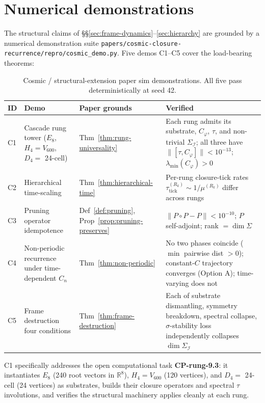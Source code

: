 \documentclass[11pt]{article}
\theoremstyle{plain}
\theoremstyle{definition}
\theoremstyle{remark}
\newcommand{\Ical}{\mathcal{I}}
\newcommand{\Cph}{C_\varphi}
\begin{document}
\section{Numerical demonstrations}\label{sec:cosmic-numerical}

The structural claims of \S\S\ref{sec:frame-dynamics}--\ref{sec:hierarchy} are grounded by a numerical demonstration suite \texttt{papers/cosmic-closure-recurrence/repro/cosmic\_demo.py}. Five demos C1--C5 cover the load-bearing theorems:

\begin{table}[h]
\centering
\small
\caption{Cosmic / structural-extension paper sim demonstrations. All five pass deterministically at seed 42.}\label{tab:cosmic-numerical-demos}
\begin{tabular}{p{0.8cm}p{4.4cm}p{3.0cm}p{5.0cm}}
\toprule
ID & Demo & Paper grounds & Verified \\
\midrule
C1 & Cascade rung tower ($E_8$, $H_4 = V_{600}$, $D_4 =$ 24-cell) & Thm~\ref{thm:rung-universality} & Each rung admits its substrate, $\Cph$, $\tau$, and non-trivial $\Sigma_\Ical$; all three have $\|[\tau, \Cph]\| < 10^{-13}$; $\lambda_{\min}(\Cph) > 0$ \\
C2 & Hierarchical time-scaling & Thm~\ref{thm:hierarchical-time} & Per-rung closure-tick rates $\tau_{\mathrm{tick}}^{(R_k)} \sim 1/\mu^{(R_k)}$ differ across rungs \\
C3 & Pruning operator idempotence & Def~\ref{def:pruning}, Prop~\ref{prop:pruning-preserves} & $\|P \circ P - P\| < 10^{-10}$; $P$ self-adjoint; rank $= \dim \Sigma$ \\
C4 & Non-periodic recurrence under time-dependent $C_n$ & Thm~\ref{thm:non-periodic} & No two phases coincide ($\min$ pairwise dist $> 0$); constant-$C$ trajectory converges (Option A); time-varying does not \\
C5 & Frame destruction four conditions & Thm~\ref{thm:frame-destruction} & Each of substrate dismantling, symmetry breakdown, spectral collapse, $\sigma$-stability loss independently collapses $\dim \Sigma_\Ical$ \\
\bottomrule
\end{tabular}
\end{table}

C1 specifically addresses the open computational task \textbf{CP-rung-9.3}: it instantiates $E_8$ (240 root vectors in $\mathbb{R}^8$), $H_4 = V_{600}$ (120 vertices), and $D_4 =$ 24-cell (24 vertices) as substrates, builds their closure operators and spectral $\tau$ involutions, and verifies the structural machinery applies cleanly at each rung.
\end{document}
